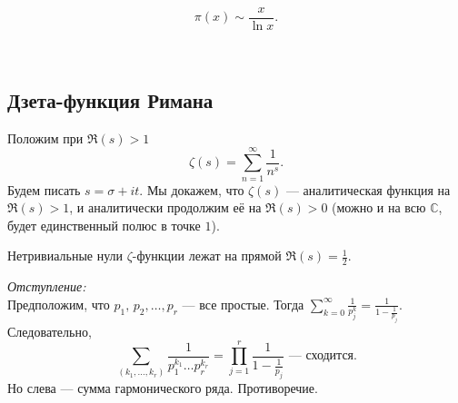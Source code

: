 \begin{theorem} \label{l1_thm2}
	$$\pi(x) \sim \frac{x}{\ln x}.$$
\end{theorem}~\\

\subsection{Дзета-функция Римана}
Положим при $\Re(s) > 1$
$$\zeta(s) = \sum_{n=1}^\infty \frac{1}{n^s}.$$
Будем писать $s = \sigma + it$. Мы докажем, что $\zeta(s)$ — аналитическая функция на $\Re(s) > 1$, и аналитически продолжим её на $\Re(s) > 0$ (можно и на всю $\mathbb{C}$, будет единственный полюс в точке $1$).

\begin{theorem} \label{l1_RiemannHypothesis}
	Нетривиальные нули $\zeta$-функции лежат на прямой $\Re(s) = \frac{1}{2}$.
\end{theorem}

\textit{Отступление:}\\
	Предположим, что $p_1,\,p_2,\dots,p_r$ — все простые. Тогда
	$\displaystyle \sum\limits_{k=0}^\infty \frac{1}{p_j^k} = \frac{1}{1-\frac{1}{p_j}}$. Следовательно,
	$$\sum_{(k_1,\dots,k_r)} \frac{1}{p_1^{k_1} \dots p_r^{k_r}} = \prod_{j=1}^r \frac{1}{1-\frac{1}{p_j}} \text{ — сходится}.$$
	Но слева — сумма гармонического ряда. Противоречие.